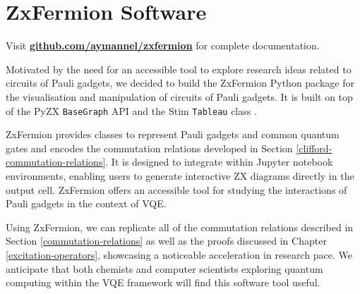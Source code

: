 \chapter{ZxFermion Software}%
\label{zxfermion}

Visit \textbf{\href{https://github.com/aymannel/zxfermion}{github.com/aymannel/zxfermion} }for complete documentation.

Motivated by the need for an accessible tool to explore research ideas related to circuits of Pauli gadgets, we decided to build the ZxFermion Python package for the visualisation and manipulation of circuits of Pauli gadgets. It is built on top of the PyZX \lstinline{BaseGraph} API \cite{Kissinger2020} and the Stim \lstinline{Tableau} class \cite{Gidney2021}.

ZxFermion provides classes to represent Pauli gadgets and common quantum gates and encodes the commutation relations developed in Section \ref{clifford-commutation-relations}. It is designed to integrate within Jupyter notebook environments, enabling users to generate interactive ZX diagrams directly in the output cell. ZxFermion offers an accessible tool for studying the interactions of Pauli gadgets in the context of VQE.

Using ZxFermion, we can replicate all of the commutation relations described in Section \ref{commutation-relations} as well as the proofs discussed in Chapter \ref{excitation-operators}, showcasing a noticeable acceleration in research pace. We anticipate that both chemists and computer scientists exploring quantum computing within the VQE framework will find this software tool useful.

